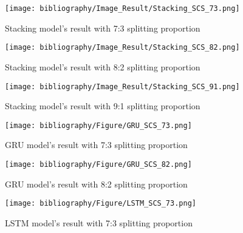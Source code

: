 \documentclass{ieeeojies}
\begin{document}
\vspace{-2em}
\begin{figure}[H]
  \centering
  \begin{minipage}{0.8\linewidth}
    \centering
    \texttt{[image: bibliography/Image\_Result/Stacking\_SCS\_73.png]}
    \caption{Stacking model's result with 7:3 splitting proportion}
    \label{fig8}
  \end{minipage}
\end{figure}

\begin{figure}[H]
  \centering
  \begin{minipage}{0.8\linewidth}
    \centering
    \texttt{[image: bibliography/Image\_Result/Stacking\_SCS\_82.png]}
    \caption{Stacking model's result with 8:2 splitting proportion}
    \label{fig9}
  \end{minipage}
\end{figure}

\begin{figure}[H]
  \centering
  \begin{minipage}{0.8\linewidth}
    \centering
    \texttt{[image: bibliography/Image\_Result/Stacking\_SCS\_91.png]}
    \caption{Stacking model's result with 9:1 splitting proportion}
    \label{fig8}
  \end{minipage}
\end{figure}

\begin{figure}[H]
  \centering
  \begin{minipage}{0.8\linewidth}
    \centering
    \texttt{[image: bibliography/Figure/GRU\_SCS\_73.png]}
    \caption{GRU model's result with 7:3 splitting proportion}
    \label{fig9}
  \end{minipage}
\end{figure}

\begin{figure}[H]
  \centering
  \begin{minipage}{0.8\linewidth}
    \centering
    \texttt{[image: bibliography/Figure/GRU\_SCS\_82.png]}
    \caption{GRU model's result with 8:2 splitting proportion}
    \label{fig8}
  \end{minipage}
\end{figure}

\begin{figure}[H]
  \centering
  \begin{minipage}{0.8\linewidth}
    \centering
    \texttt{[image: bibliography/Figure/LSTM\_SCS\_73.png]}
    \caption{LSTM model's result with 7:3 splitting proportion}
    \label{fig8}
  \end{minipage}
\end{figure}
\end{document}
